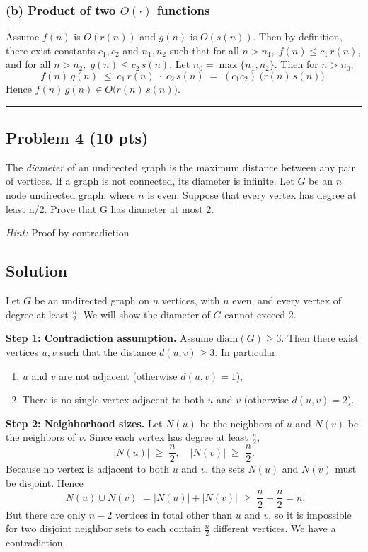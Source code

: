 \documentclass[12pt]{article}
\begin{document}
\subsubsection*{(b) Product of two $O(\cdot)$ functions}

Assume \(f(n)\) is \(O(r(n))\) and \(g(n)\) is \(O(s(n))\). Then by definition, there exist constants \(c_1,c_2\) and \(n_1,n_2\) such that for all \(n>n_1,\; f(n)\le c_1\,r(n)\), and for all \(n>n_2,\; g(n)\le c_2\,s(n)\). Let \(n_0 = \max\{n_1,n_2\}\). Then for \(n>n_0\),
\[
f(n)\,g(n) \;\le\; c_1\,r(n)\;\cdot\;c_2\,s(n)
\;=\; (c_1 c_2)\;\bigl(r(n)\,s(n)\bigr).
\]
Hence \(f(n)\,g(n)\in O\bigl(r(n)\,s(n)\bigr)\). 

\hrule
\vspace{1em}


\subsection*{Problem 4 (10 pts)}
The \textit{diameter} of an undirected graph is the maximum distance between any pair of vertices. If a graph is not connected, its diameter is infinite. Let $G$ be an $n$ node undirected graph, where $n$ is even. Suppose that every vertex has degree at least n/2. Prove that G has diameter at most 2.

\textit{Hint:} Proof by contradiction

\subsection*{Solution}

Let \(G\) be an undirected graph on \(n\) vertices, with \(n\) even, and every vertex of degree at least \(\tfrac{n}{2}\). We will show the diameter of \(G\) cannot exceed 2.

\bigskip
\textbf{Step 1: Contradiction assumption.}
Assume \(\mathrm{diam}(G)\ge3\). Then there exist vertices \(u,v\) such that the distance \(d(u,v)\ge3\). In particular:
\begin{enumerate}
    \item \(u\) and \(v\) are not adjacent (otherwise \(d(u,v)=1\)),
    \item There is no single vertex adjacent to both \(u\) and \(v\) (otherwise \(d(u,v)=2\)).
\end{enumerate}

\bigskip
\textbf{Step 2: Neighborhood sizes.}
Let \(N(u)\) be the neighbors of \(u\) and \(N(v)\) be the neighbors of \(v\). Since each vertex has degree at least \(\tfrac{n}{2}\),
\[
|N(u)| \;\ge\; \frac{n}{2}, 
\quad
|N(v)| \;\ge\; \frac{n}{2}.
\]
Because no vertex is adjacent to both \(u\) and \(v\), the sets \(N(u)\) and \(N(v)\) must be disjoint. Hence
\[
|N(u)\cup N(v)| = |N(u)| + |N(v)|
\;\ge\; \frac{n}{2} + \frac{n}{2}
= n.
\]
But there are only \(n-2\) vertices in total other than \(u\) and \(v\), so it is impossible for two disjoint neighbor sets to each contain \(\tfrac{n}{2}\) different vertices. We have a contradiction.
\end{document}
